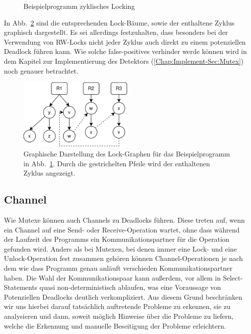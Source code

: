 \begin{figure}[h!]
  
  \caption{Beispielprogramm zyklisches Locking}
  \label{Chap:Analyze-Sec:Mutex-Fig:ZyclicTreeCode}
\end{figure}
In Abb.~\ref{Chap:Analyze-Sec:Mutex-Fig:ZyclicTreeImg} sind die entsprechenden
Lock-Bäume, sowie der enthaltene Zyklus graphisch dargestellt. Es sei allerdings 
festzuhalten, dass besonders bei der Verwendung von RW-Locks nicht jeder 
Zyklus auch direkt zu einem potenziellen Deadlock führen kann. Wie solche 
false-positives verhinder werde können wird in dem Kapitel zur Implementierung
des Detektors (\ref{Chap:Implement-Sec:Mutex}) noch genauer betrachtet.
\begin{figure}[h!]
  \centering
  \includegraphics[width=0.5\textwidth]{img/tree_example.eps}
  \caption{Graphische Darstellung des Lock-Graphen für das Beispielprogramm in 
    Abb.~\ref{Chap:Analyze-Sec:Mutex-Fig:ZyclicTreeCode}. Durch die gestrichelten 
    Pfeile wird der enthaltenen Zyklus angezeigt.}
    \label{Chap:Analyze-Sec:Mutex-Fig:ZyclicTreeImg}
\end{figure}


\subsection{Channel}


Wie Mutexe können auch Channels zu Deadlocks führen. Diese treten auf,
wenn ein Channel auf eine Send- oder Receive-Operation wartet, ohne dass
während der Laufzeit des Programms ein Kommunikationspartner für die 
Operation gefunden wird. Anders als bei Mutexen, bei denen immer eine Lock-
und eine Unlock-Operation fest zusammen gehören können Channel-Operationen
je nach dem wie dass Programm genau anläuft verschieden Kommunikationspartner 
haben. Die Wahl der Kommunikationspaar kann außerdem, vor allem in Select-Statements
quasi non-deterministisch ablaufen, was eine Voraussage von Potenziellen 
Deadlocks deutlich verkompliziert. Aus diesem Grund beschränken wir uns 
hierbei darauf tatsächlich auftretende Probleme zu erkennen, sie zu analysieren 
und dann, soweit möglich Hinweise über die Probleme zu liefern, welche die 
Erkennung und manuelle Beseitigung der Probleme erleichtern.


